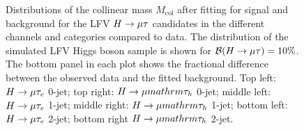 \documentclass[oneside, letterpaper, oldfontcommands]{memoir}
\begin{document}
{{{\begin{figure}[hbtp]\centering
\caption{Distributions of the collinear mass $M_\text{col}$ after fitting for signal and background  for the LFV $H \rightarrow \mu \mathrm{\tau}$ candidates in
the different
channels and categories compared to data.
The distribution of the simulated LFV Higgs boson sample is shown for $\mathcal{B}(H \rightarrow \mu \mathrm{\tau} )=10\%$.
The bottom panel in each plot shows the fractional difference between the observed data and the fitted background. Top left: $H \rightarrow \mu \mathrm{\tau}_{e}$ 0-jet; top right: $H \rightarrow \mu mathrm{\tau_{h}}$ 0-jet;
middle left: $H \rightarrow \mu \mathrm{\tau}_{e}$ 1-jet; middle right: $H \rightarrow \mu mathrm{\tau_{h}}$ 1-jet; bottom left: $H \rightarrow \mu \mathrm{\tau}_{e}$ 2-jet;
bottom right $H \rightarrow \mu mathrm{\tau_{h}}$ 2-jet.}
 \label{fig:Mcol_SignalRegion}\end{figure}
 
}}}
\end{document}
